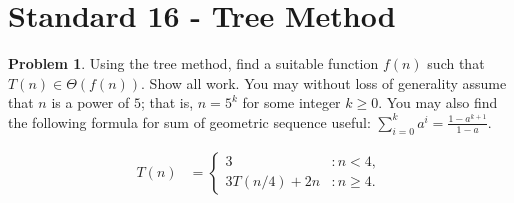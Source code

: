 \documentclass[11pt]{article}
\theoremstyle{definition}
\theoremstyle{definition}
\newtheorem{required}{Problem}
\theoremstyle{definition}
\begin{document}
\newpage
\section{Standard 16 - Tree Method}
\begin{required}
Using the tree method, find a suitable function $f(n)$ such that $T(n) \in \Theta(f(n))$. Show all work. You may without loss of generality assume that $n$ is a power of $5$; that is, $n = 5^{k}$ for some integer $k \geq 0$. You may also find the following formula for sum of geometric sequence useful: $\sum_{i=0}^k a^i =\frac{1-a^{k+1}}{1-a}$. 

\begin{align*}
T(n) &= \begin{cases} 
3 & : n < 4, \\
3T(n/4) + 2n & : n \geq 4.
\end{cases}
\end{align*}
\end{required}
\end{document}
